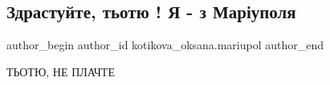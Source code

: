  
 
 
 
 

\subsection{Здрастуйте, тьотю ! Я - з Маріуполя}
\label{sec:22_04_2022.fb.kotikova_oksana.mariupol.1.zdrastuite__totyu___}

\ifcmt
 author_begin
   author_id kotikova_oksana.mariupol
 author_end
\fi

ТЬОТЮ, НЕ ПЛАЧТЕ

